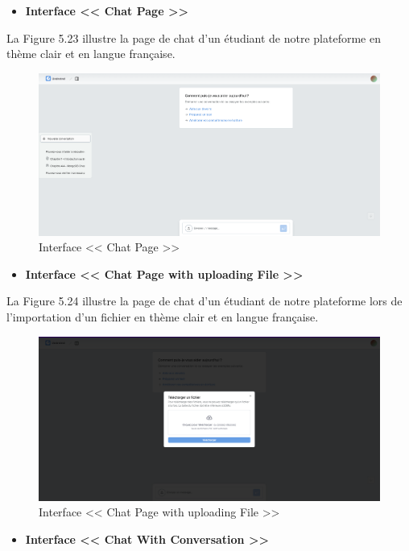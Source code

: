 \begin{itemize}
    \item \textbf{Interface << Chat Page >>}
\end{itemize}
La Figure 5.23 illustre la page de chat d'un étudiant de notre plateforme en thème clair et en langue française.
\begin{figure}[H]
    \centering
    \includegraphics[width=1.1\textwidth,height=0.5\textwidth]{images/chp5/fig23.png}
    \caption{Interface << Chat Page >>}
    \label{Interface << Chat Page >>}    
\end{figure}
\begin{itemize}
    \item \textbf{Interface << Chat Page with uploading File >>}
\end{itemize}
La Figure 5.24 illustre la page de chat d'un étudiant de notre plateforme lors de l'importation d'un fichier en thème clair et en langue française.
\begin{figure}[H]
    \centering
    \includegraphics[width=1.1\textwidth,height=0.5\textwidth]{images/chp5/fig24.png}
    \caption{Interface << Chat Page with uploading File >>}
    \label{Interface << Chat Page with uploading File >>}    
\end{figure}
\begin{itemize}
    \item \textbf{Interface << Chat With Conversation >>}
\end{itemize}
